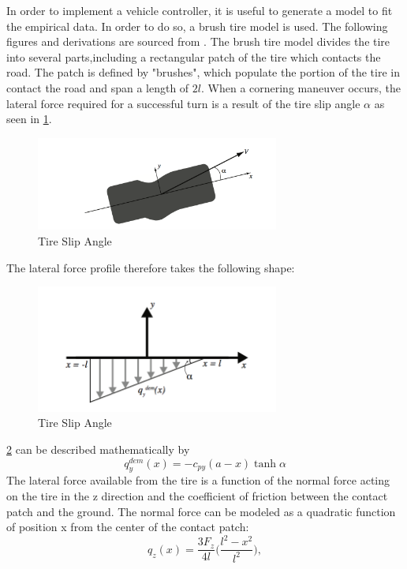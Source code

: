 \documentclass{article}
\numberwithin{equation}{section}
\begin{document}
In order to implement a vehicle controller, it is useful to generate a model to fit the empirical data. In order to do so, a brush tire model is used. The following figures and derivations are sourced from \cite{Hindiyeh}. 
The brush tire model divides the tire into several parts,including a rectangular patch of the tire which contacts the road. The patch is defined by "brushes", which populate the portion of the tire in contact the road and span a length of $2l$. When a cornering maneuver occurs, the lateral force required for a successful turn is a result of the tire slip angle $\alpha$ as seen in \ref{fig:SlipAngle}. 
\begin{figure}[H]
\centering
\includegraphics[width=8cm]{SlipAngle.png}
\caption{Tire Slip Angle}
\label{fig:SlipAngle}
\end{figure}
The lateral force profile therefore takes the following shape:
\begin{figure}[H]
\centering
\includegraphics[width=8cm]{LatForceProfile.png}
\caption{Tire Slip Angle}
\label{fig:LatForceProfile}
\end{figure}
\ref{fig:LatForceProfile} can be described mathematically by
\begin{equation}\label{eq2.11}
    q_y^{dem}(x) = -c_{py}(a-x)\tanh{\alpha}
\end{equation}
The lateral force available from the tire is a function of the normal force acting on the tire in the z direction and the coefficient of friction between the contact patch and the ground. The normal force can be modeled as a quadratic function of position x from the center of the contact patch:
\begin{equation}\label{eq2.12}
    q_z(x) = \frac{3F_z}{4l}\bigg(\frac{l^2-x^2}{l^2}\bigg),
\end{equation}
\end{document}
